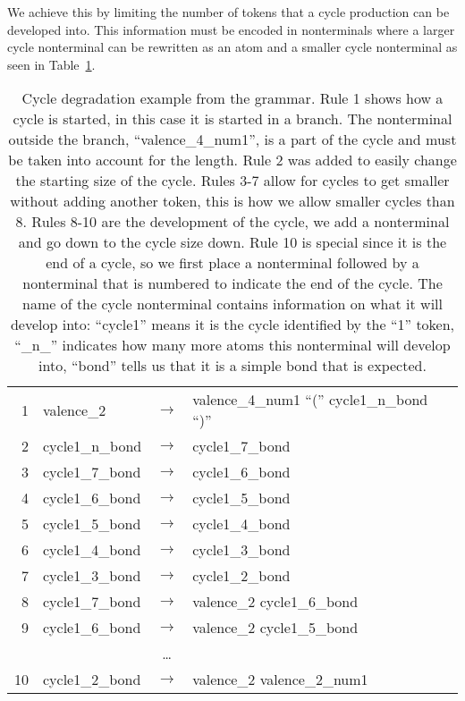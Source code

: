\documentclass[../Document.tex]{subfiles}
\begin{document}
We achieve this by limiting the number of tokens that a cycle production can be developed into. This information must be encoded in nonterminals where a larger cycle nonterminal can be rewritten as an atom and a smaller cycle nonterminal as seen in Table~\ref{tab:grammar-cycle-degradation}.

\begin{table}[ht]
    \centering
    \begin{tabular}{r | l c l}
        1 & valence\_2 & $\rightarrow$ & valence\_4\_num1 ``('' cycle1\_n\_bond ``)'' \\
        2 & cycle1\_n\_bond & $\rightarrow$ & cycle1\_7\_bond \\
        3 & cycle1\_7\_bond & $\rightarrow$ & cycle1\_6\_bond \\
        4 & cycle1\_6\_bond & $\rightarrow$ & cycle1\_5\_bond \\
        5 & cycle1\_5\_bond & $\rightarrow$ & cycle1\_4\_bond \\
        6 & cycle1\_4\_bond & $\rightarrow$ & cycle1\_3\_bond \\
        7 & cycle1\_3\_bond & $\rightarrow$ & cycle1\_2\_bond \\
        8 & cycle1\_7\_bond & $\rightarrow$ & valence\_2 cycle1\_6\_bond \\
        9 & cycle1\_6\_bond & $\rightarrow$ & valence\_2 cycle1\_5\_bond \\
        & & \ldots & \\
        10 & cycle1\_2\_bond & $\rightarrow$ & valence\_2 valence\_2\_num1 \\
    \end{tabular}
    \caption[Cycle degradation example from the grammar]{Cycle degradation example from the grammar.
    Rule 1 shows how a cycle is started, in this case it is started in a branch. The nonterminal outside the branch, ``valence\_4\_num1'', is a part of the cycle and must be taken into account for the length.
    Rule 2 was added to easily change the starting size of the cycle.
    Rules 3-7 allow for cycles to get smaller without adding another token, this is how we allow smaller cycles than 8.
    Rules 8-10 are the development of the cycle, we add a nonterminal and go down to the cycle size down.
    Rule 10 is special since it is the end of a cycle, so we first place a nonterminal followed by a nonterminal that is numbered to indicate the end of the cycle.
    The name of the cycle nonterminal contains information on what it will develop into: ``cycle1'' means it is the cycle identified by the ``1'' token, ``\_n\_'' indicates how many more atoms this nonterminal will develop into, ``bond'' tells us that it is a simple bond that is expected.}
    \label{tab:grammar-cycle-degradation}
\end{table}
\end{document}
